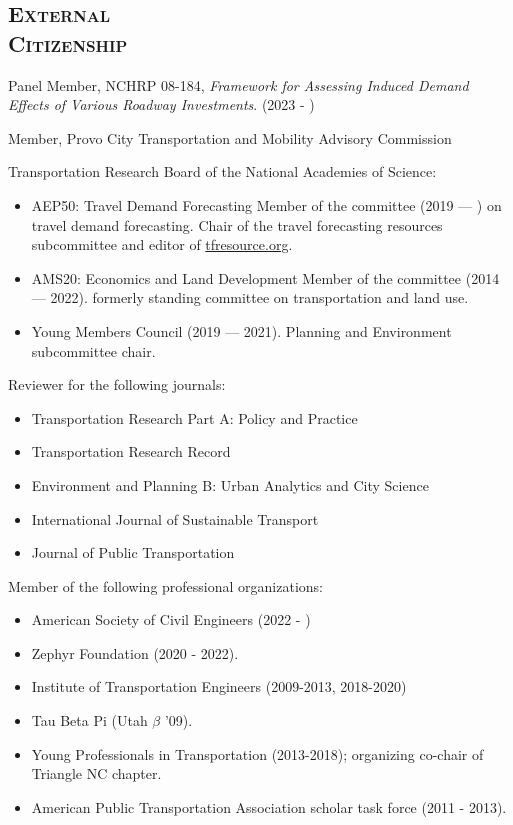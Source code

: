 \documentclass[margin,line]{res}
\newcommand{\secfont}{\scshape }
\begin{document}
\begin{resume}
\noindent\makebox[\linewidth]{\rule{\linewidth}{0.4pt}}
\section{\secfont External \\ Citizenship}



Panel Member, NCHRP 08-184, \textit{Framework for Assessing Induced Demand Effects of Various Roadway Investments}. (2023 - )

Member, Provo City Transportation and Mobility Advisory Commission

Transportation Research Board of the National Academies of Science:

\begin{itemize}
  \item AEP50: Travel Demand Forecasting Member of the committee (2019 --- ) on
  travel demand forecasting. Chair of the travel forecasting resources
  subcommittee and editor of \url{tfresource.org}.
  \item AMS20: Economics and Land Development Member of the committee (2014
  --- 2022). formerly standing committee on transportation and land use.
  \item Young Members Council (2019 --- 2021). Planning and Environment subcommittee
  chair.
\end{itemize}


Reviewer for the following journals:

\begin{itemize}
  \item Transportation Research Part A: Policy and Practice
  \item Transportation Research Record
  \item Environment and Planning B: Urban Analytics and City Science
  \item International Journal of Sustainable Transport
  \item Journal of Public Transportation
\end{itemize}

Member of the following professional organizations:

\begin{itemize}
  \item American Society of Civil Engineers (2022 - )
  \item Zephyr Foundation (2020 - 2022).
  \item Institute of Transportation Engineers (2009-2013, 2018-2020)
  \item Tau Beta Pi (Utah $\beta$ '09).
  \item Young Professionals in Transportation (2013-2018); organizing co-chair of
Triangle NC chapter.
  \item American Public Transportation Association scholar task force (2011 - 2013).
\end{itemize}


\end{resume}
\end{document}
